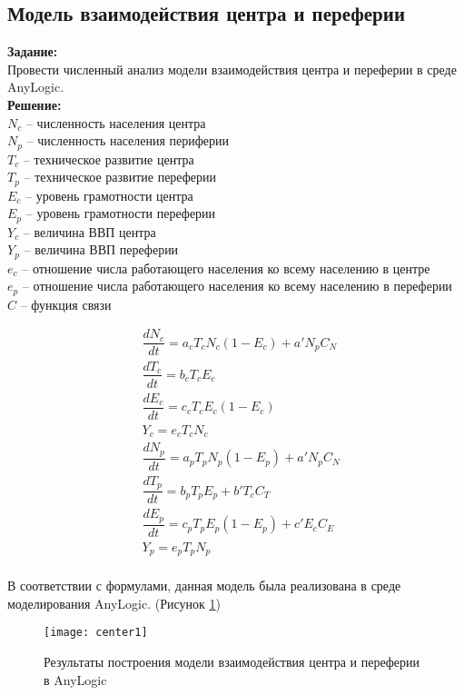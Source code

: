 \subsection*{Модель взаимодействия центра и переферии}

\textbf{Задание:}\\
Провести численный анализ модели взаимодействия центра и переферии в среде AnyLogic.\\

\textbf{Решение:}\\
$N_c$ -- численность населения центра\\
$N_p$ -- численность населения периферии\\
$T_c$ -- техническое развитие центра\\
$T_p$ -- техническое развитие переферии\\
$E_c$ -- уровень грамотности центра\\
$E_p$ -- уровень грамотности переферии\\
$Y_c$ -- величина ВВП центра\\
$Y_p$ -- величина ВВП переферии\\
$e_c$ -- отношение числа работающего населения ко всему населению в центре\\
$e_p$ -- отношение числа работающего населения ко всему населению в переферии\\
$C$ -- функция связи

\begin{align*}
& \dfrac{dN_c}{dt} = a_c T_c N_c (1 - E_c) + a' N_p C_N\\
& \dfrac{dT_c}{dt} = b_c T_c E_c\\
& \dfrac{dE_c}{dt} = c_c T_c E_c (1 - E_c)\\
& Y_c = e_c T_c N_c\\
& \dfrac{dN_p}{dt} = a_p T_p N_p (1 - E_p) + a' N_p C_N\\
& \dfrac{dT_p}{dt} = b_p T_p E_p + b' T_c C_T\\
& \dfrac{dE_p}{dt} = c_p T_p E_p (1 - E_p) + c' E_c C_E\\
& Y_p = e_p T_p N_p\\
\end{align*}

\newpage

В соответствии с формулами, данная модель была реализована в среде моделирования AnyLogic. (Рисунок \ref{fig:center1})
\begin{figure}[h]
	\centering \texttt{[image: center1]}
	\caption{Результаты построения модели взаимодействия центра и переферии в AnyLogic}
	\label{fig:center1}
\end{figure}

